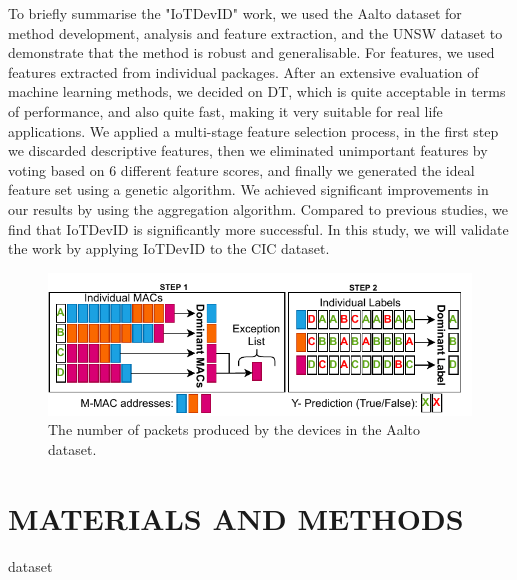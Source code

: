 \documentclass[journal]{IEEEtran}
\begin{document}
To briefly summarise the "IoTDevID" work, we used the Aalto dataset for method development, analysis and feature extraction, and the UNSW dataset to demonstrate that the method is robust and generalisable. For features, we used features extracted from individual packages. After an extensive evaluation of machine learning methods, we decided on DT, which is quite acceptable in terms of performance, and also quite fast, making it very suitable for real life applications. We applied a multi-stage feature selection process, in the first step we discarded descriptive features, then we eliminated unimportant features by voting based on 6 different feature scores, and finally we generated the ideal feature set using a genetic algorithm. We achieved significant improvements in our results by using the aggregation algorithm. Compared to previous studies, we find that IoTDevID is significantly more successful. In this study, we will validate the work by applying IoTDevID to the CIC dataset.




\begin{figure}[ht]
	\centerline{\includegraphics[width=1\columnwidth]{images/agregation.pdf}}
	\caption{The number of packets produced by the devices in the Aalto dataset.}
	\label{fig:pie}
\end{figure}






\section{MATERIALS AND METHODS}


dataset
\end{document}

